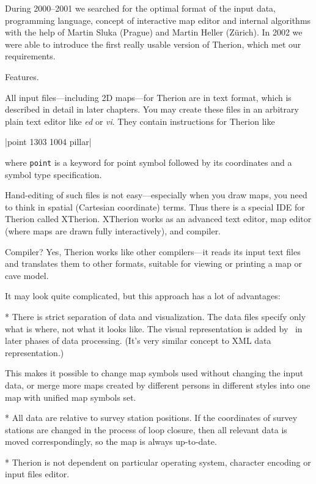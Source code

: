 During 2000--2001 we searched for the optimal format of the input data, programming 
language, concept of interactive map editor and internal algorithms with the 
help of Martin Sluka (Prague) and Martin Heller (Z\"urich). In 2002 we were able to 
introduce the first really usable version of Therion, which met our requirements.


\subchapter Features.

All input files---including 2D maps---for Therion are in text format, which is 
described in detail in later chapters. You may create these files in an arbitrary plain 
text editor like {\it ed} or {\it vi}. They contain instructions for Therion 
like 

|point 1303 1004 pillar| 

where {\tt point} is a keyword for point symbol 
followed by its coordinates and a symbol type specification.

Hand-editing of such files is not easy---especially when you draw maps, you 
need to think in spatial (Cartesian coordinate) terms. Thus there is a special IDE 
for Therion called XTherion. XTherion works as an advanced text editor, map 
editor (where maps are drawn fully interactively), and compiler.

Compiler? Yes, Therion works like other compilers---it reads its input
text files and translates them to other formats, suitable for viewing or 
printing a map or cave model.

It may look quite complicated, but this approach has a lot of advantages:

\list
* There is strict separation of data and visualization. The data files specify 
  only what is where, not what it looks like. The visual 
  representation is added by \MP\ in later phases of data processing. (It's very 
  similar concept to XML data representation.) 
  
  This makes it possible to change map symbols used without changing the 
  input data, or merge more maps created by different persons in different 
  styles into one map with unified map symbols set.
  
* All data are relative to survey station positions. If the coordinates
  of survey stations are changed in the process of loop closure, then all relevant
  data is moved correspondingly, so the map is always up-to-date.

* Therion is not dependent on particular operating system, character encoding
  or input files editor.

\endlist

